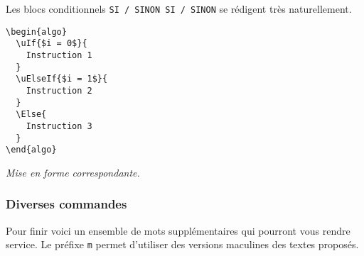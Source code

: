 \documentclass[12pt,a4paper]{article}
\theoremstyle{definition}
\newenvironment{frame-gene}[1][]{
	\begin{tcolorbox}[
		title        = #1, 
		colbacktitle = black!10!white, 
		colback      = white, 
		coltitle     = black,
		fonttitle    = \bfseries\itshape\small, 
		breakable,
		center title]
}{
	\end{tcolorbox}
}
\begin{document}
Les blocs conditionnels \verb+SI / SINON SI / SINON+ se rédigent très naturellement.


\begin{multicols}{2}
    \centering
    \begin{frame-gene}
\begin{verbatim}
\begin{algo}
  \uIf{$i = 0$}{
    Instruction 1
  }
  \uElseIf{$i = 1$}{
    Instruction 2
  }
  \Else{
    Instruction 3
  }
\end{algo}
\end{verbatim}
    \end{frame-gene}
    \vfill\null
    \columnbreak
    \textit{Mise en forme correspondante.}
\begin{algo}
\end{algo}
    \vfill\null
\end{multicols}


\subsubsection{Diverses commandes}

Pour finir voici un ensemble de mots supplémentaires qui pourront vous rendre service. Le préfixe \verb+m+ permet d'utiliser des versions maculines des textes proposés.
\end{document}
